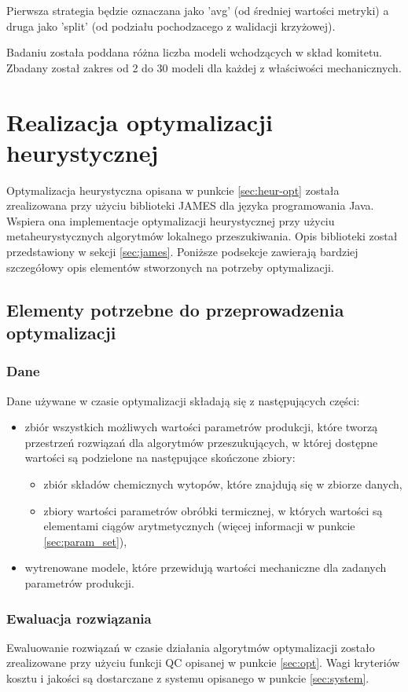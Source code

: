 Pierwsza strategia będzie oznaczana jako 'avg' (od średniej wartości metryki) a druga jako 'split' (od podziału pochodzacego z walidacji krzyżowej).

Badaniu została poddana różna liczba modeli wchodzących w skład komitetu. Zbadany został zakres od 2 do 30 modeli dla każdej z właściwości mechanicznych.

\section{Realizacja optymalizacji heurystycznej}\label{sec:opt-realization}
Optymalizacja heurystyczna opisana w punkcie \ref{sec:heur-opt} została zrealizowana przy użyciu biblioteki JAMES dla języka programowania Java. Wspiera ona implementacje optymalizacji heurystycznej przy użyciu metaheurystycznych algorytmów lokalnego przeszukiwania. Opis biblioteki został przedstawiony w sekcji \ref{sec:james}. Poniższe podsekcje zawierają bardziej szczegółowy opis elementów stworzonych na potrzeby optymalizacji.

\subsection{Elementy potrzebne do przeprowadzenia optymalizacji}
\subsubsection{Dane}
Dane używane w czasie optymalizacji składają się z następujących części:
\begin{itemize}
    \item zbiór wszystkich możliwych wartości parametrów produkcji, które tworzą przestrzeń rozwiązań dla algorytmów przeszukujących, w której dostępne wartości są podzielone na następujące skończone zbiory:
    \begin{itemize}
        \item zbiór składów chemicznych wytopów, które znajdują się w zbiorze danych,
        \item zbiory wartości parametrów obróbki termicznej, w których wartości są elementami ciągów arytmetycznych (więcej informacji w punkcie \ref{sec:param_set}),
    \end{itemize}
    \item wytrenowane modele, które przewidują wartości mechaniczne dla zadanych parametrów produkcji.
\end{itemize}

\subsubsection{Ewaluacja rozwiązania}
Ewaluowanie rozwiązań w czasie działania algorytmów optymalizacji zostało zrealizowane przy użyciu funkcji QC opisanej w punkcie \ref{sec:opt}. Wagi kryteriów kosztu i jakości są dostarczane z systemu opisanego w punkcie \ref{sec:system}.

